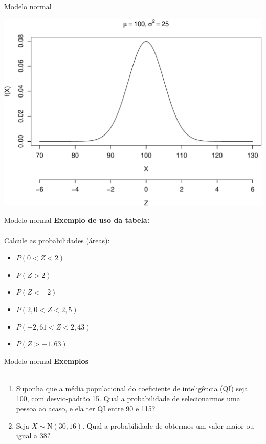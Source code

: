 \documentclass[10pt]{beamer}\usepackage[]{graphicx}\usepackage[]{color}
\newenvironment{knitrout}{}{} %
\providecommand{\N}{\text{N}}
\theoremstyle{definition}
\begin{document}
\begin{frame}[fragile]{Modelo normal}
\begin{knitrout}\footnotesize
{}\color{fgcolor}

{\centering \includegraphics[width=1\textwidth]{figure/unnamed-chunk-6-1} 

}



\end{knitrout}
\end{frame}

\begin{frame}[fragile]{Modelo normal}
  \textbf{Exemplo de uso da tabela:} \\~\\
  Calcule as probabilidades (áreas):
  \begin{itemize}
  \item $P(0 < Z < 2)$
  \item $P(Z > 2)$
  \item $P(Z < -2)$
  \item $P(2,0 < Z < 2,5)$
  \item $P(-2,61 < Z < 2,43)$
  \item $P(Z > -1,63)$
  \end{itemize}
\end{frame}

\begin{frame}[fragile]{Modelo normal}
  \textbf{Exemplos} \\~\\
  \begin{enumerate}
  \item Suponha que a média populacional do coeficiente de inteligência
    (QI) seja 100, com desvio-padrão 15. Qual a probabilidade de
    selecionarmos uma pessoa ao acaso, e ela ter QI entre 90 e 115?
  \item Seja $X \sim \N(30, 16)$. Qual a probabilidade de obtermos um
    valor maior ou igual a 38?
  \end{enumerate}
\end{frame}
\end{document}
